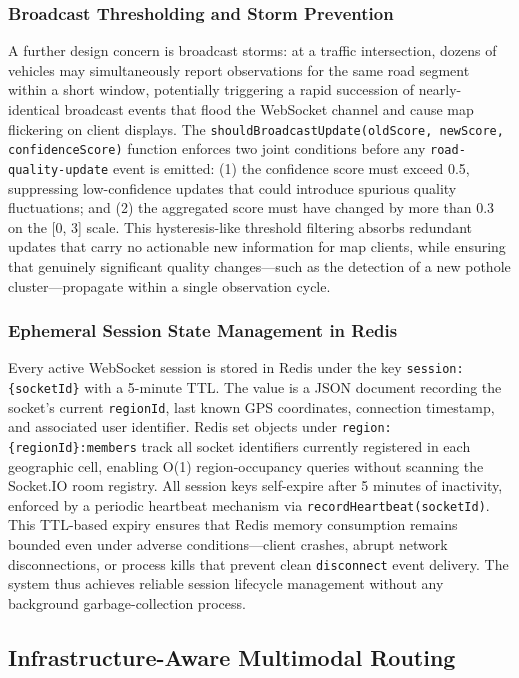 \documentclass[conference]{IEEEtran}
\begin{document}
\subsubsection{Broadcast Thresholding and Storm Prevention}
\label{sec:broadcast_thresholding}
A further design concern is broadcast storms: at a traffic intersection, dozens of vehicles may simultaneously report observations for the same road segment within a short window, potentially triggering a rapid succession of nearly-identical broadcast events that flood the WebSocket channel and cause map flickering on client displays.
The \texttt{shouldBroadcastUpdate(oldScore, newScore, confidenceScore)} function enforces two joint conditions before any \texttt{road-quality-update} event is emitted: (1) the confidence score must exceed 0.5, suppressing low-confidence updates that could introduce spurious quality fluctuations;
and (2) the aggregated score must have changed by more than 0.3 on the [0, 3] scale.
This hysteresis-like threshold filtering absorbs redundant updates that carry no actionable new information for map clients, while ensuring that genuinely significant quality changes---such as the detection of a new pothole cluster---propagate within a single observation cycle.

\subsubsection{Ephemeral Session State Management in Redis}
Every active WebSocket session is stored in Redis under the key \texttt{session:\{socketId\}} with a 5-minute TTL.
The value is a JSON document recording the socket's current \texttt{regionId}, last known GPS coordinates, connection timestamp, and associated user identifier.
Redis set objects under \texttt{region:\{regionId\}:members} track all socket identifiers currently registered in each geographic cell, enabling O(1) region-occupancy queries without scanning the Socket.IO room registry.
All session keys self-expire after 5 minutes of inactivity, enforced by a periodic heartbeat mechanism via \texttt{recordHeartbeat(socketId)}.
This TTL-based expiry ensures that Redis memory consumption remains bounded even under adverse conditions---client crashes, abrupt network disconnections, or process kills that prevent clean \texttt{disconnect} event delivery. The system thus achieves reliable session lifecycle management without any background garbage-collection process.

\subsection{Infrastructure-Aware Multimodal Routing}
\end{document}
